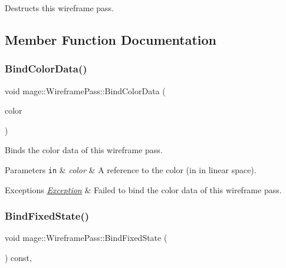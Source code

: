 Destructs this wireframe pass. 

\subsection{Member Function Documentation}
\hypertarget{classmage_1_1_wireframe_pass_aaf16a7d1b6c9d38ac1bf8aa97b7a8b11}{}\label{classmage_1_1_wireframe_pass_aaf16a7d1b6c9d38ac1bf8aa97b7a8b11} 
\subsubsection{\texorpdfstring{Bind\+Color\+Data()}{BindColorData()}}
{\footnotesize\ttfamily void mage\+::\+Wireframe\+Pass\+::\+Bind\+Color\+Data (\begin{DoxyParamCaption}\item[{const \hyperlink{structmage_1_1_r_g_b_a}{R\+G\+BA} \&}]{color }\end{DoxyParamCaption})\hspace{0.3cm}{\ttfamily [private]}}

Binds the color data of this wireframe pass.


\begin{DoxyParams}[1]{Parameters}
\mbox{\tt in}  & {\em color} & A reference to the color (in in linear space). \\
\hline
\end{DoxyParams}

\begin{DoxyExceptions}{Exceptions}
{\em \hyperlink{classmage_1_1_exception}{Exception}} & Failed to bind the color data of this wireframe pass. \\
\hline
\end{DoxyExceptions}
\hypertarget{classmage_1_1_wireframe_pass_a8342bc185967b33cd585a9042fd9418d}{}\label{classmage_1_1_wireframe_pass_a8342bc185967b33cd585a9042fd9418d} 
\subsubsection{\texorpdfstring{Bind\+Fixed\+State()}{BindFixedState()}}
{\footnotesize\ttfamily void mage\+::\+Wireframe\+Pass\+::\+Bind\+Fixed\+State (\begin{DoxyParamCaption}{ }\end{DoxyParamCaption}) const\hspace{0.3cm}{\ttfamily [private]}, {\ttfamily [noexcept]}}

